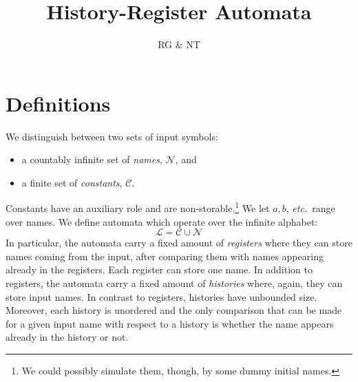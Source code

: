 \documentclass{article}
\title{History-Register Automata}
\author{RG \& NT}
\theoremstyle{definition}
\newcommand\LL{\mathcal{L}}
\newcommand\names{\mathcal{N}}
\newcommand\const{\mathcal{C}}
\begin{document}
\maketitle



\section{Definitions}
%
We distinguish between two sets of input symbols:
\begin{itemize}
 \item a countably infinite set of \emph{names}, $\names$, and
 \item a finite set of \emph{constants}, $\const$.
\end{itemize}
Constants have an auxiliary role and are non-storable.\footnote{We could possibly simulate them, though, by some dummy initial names.}
We let $a,b$, \emph{etc.}~range over names.
We define automata which operate over the infinite alphabet:
\[
\LL = \const\cup\names
\]
In particular, the automata carry a fixed amount of \emph{registers} where they can store names coming from the input, after comparing them with names appearing already in the registers. Each register can store one name. In addition to registers, the automata carry a fixed amount of \emph{histories} where, again, they can store input names. In contrast to registers, histories have unbounded size.  Moreover, each history is unordered and the only comparison that can be made for a given input name with respect to a history is whether the name appears already in the history or not.
\end{document}
